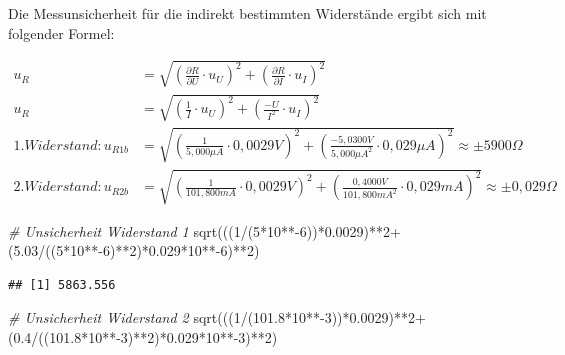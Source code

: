 \documentclass[class=article, crop=false]{standalone}
\newenvironment{Shaded}{\begin{snugshade}}{\end{snugshade}}
\newcommand{\CommentTok}[1]{\textcolor[rgb]{0.56,0.35,0.01}{\textit{#1}}}
\newcommand{\DecValTok}[1]{\textcolor[rgb]{0.00,0.00,0.81}{#1}}
\newcommand{\FloatTok}[1]{\textcolor[rgb]{0.00,0.00,0.81}{#1}}
\newcommand{\FunctionTok}[1]{\textcolor[rgb]{0.00,0.00,0.00}{#1}}
\newcommand{\NormalTok}[1]{#1}
\newcommand{\SpecialCharTok}[1]{\textcolor[rgb]{0.00,0.00,0.00}{#1}}
\begin{document}
Die Messunsicherheit für die indirekt bestimmten Widerstände ergibt sich
mit folgender Formel:

\begin {equation*}
\begin{split}
u_R &= \sqrt{\left (\frac{\partial R}{\partial U} \cdot u_U\right )^2 + \left (\frac{\partial R}{\partial I} \cdot u_I\right )^2 } \\
u_R &= \sqrt{\left (\frac{1}{I} \cdot u_U\right )^2 + \left (\frac{-U}{I^2} \cdot u_I\right )^2 } \\
1.Widerstand: u_{R1b}&= \sqrt{\left (\frac{1}{5,000\mu A} \cdot 0,0029V\right )^2 + \left (\frac{-5,0300V}{5,000\mu A^2} \cdot 0,029 \mu A\right )^2 } \approx \pm 5900\Omega \\
2.Widerstand: u_{R2b}&= \sqrt{\left (\frac{1}{101,800mA} \cdot 0,0029V \right )^2 + \left (\frac{0,4000V}{101,800mA^2} \cdot 0,029mA\right )^2 } \approx \pm 0,029\Omega
\end{split}
\end{equation*}

\begin{Shaded}
\begin{Highlighting}[]
\CommentTok{\# Unsicherheit Widerstand 1}
\FunctionTok{sqrt}\NormalTok{(((}\DecValTok{1}\SpecialCharTok{/}\NormalTok{(}\DecValTok{5}\SpecialCharTok{*}\DecValTok{10}\SpecialCharTok{**{-}}\DecValTok{6}\NormalTok{))}\SpecialCharTok{*}\FloatTok{0.0029}\NormalTok{)}\SpecialCharTok{**}\DecValTok{2}\SpecialCharTok{+}\NormalTok{(}\FloatTok{5.03}\SpecialCharTok{/}\NormalTok{((}\DecValTok{5}\SpecialCharTok{*}\DecValTok{10}\SpecialCharTok{**{-}}\DecValTok{6}\NormalTok{)}\SpecialCharTok{**}\DecValTok{2}\NormalTok{)}\SpecialCharTok{*}\FloatTok{0.029}\SpecialCharTok{*}\DecValTok{10}\SpecialCharTok{**{-}}\DecValTok{6}\NormalTok{)}\SpecialCharTok{**}\DecValTok{2}\NormalTok{)}
\end{Highlighting}
\end{Shaded}

\begin{verbatim}
## [1] 5863.556
\end{verbatim}

\begin{Shaded}
\begin{Highlighting}[]
\CommentTok{\# Unsicherheit Widerstand 2}
\FunctionTok{sqrt}\NormalTok{(((}\DecValTok{1}\SpecialCharTok{/}\NormalTok{(}\FloatTok{101.8}\SpecialCharTok{*}\DecValTok{10}\SpecialCharTok{**{-}}\DecValTok{3}\NormalTok{))}\SpecialCharTok{*}\FloatTok{0.0029}\NormalTok{)}\SpecialCharTok{**}\DecValTok{2}\SpecialCharTok{+}\NormalTok{(}\FloatTok{0.4}\SpecialCharTok{/}\NormalTok{((}\FloatTok{101.8}\SpecialCharTok{*}\DecValTok{10}\SpecialCharTok{**{-}}\DecValTok{3}\NormalTok{)}\SpecialCharTok{**}\DecValTok{2}\NormalTok{)}\SpecialCharTok{*}\FloatTok{0.029}\SpecialCharTok{*}\DecValTok{10}\SpecialCharTok{**{-}}\DecValTok{3}\NormalTok{)}\SpecialCharTok{**}\DecValTok{2}\NormalTok{)}
\end{Highlighting}
\end{Shaded}
\end{document}
